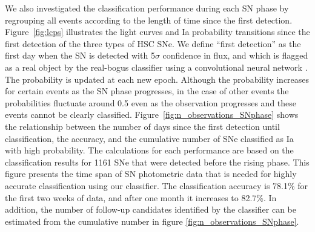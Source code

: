 \documentclass[proof]{pasj01}
\begin{document}
We also investigated the classification performance during each SN phase by regrouping all events according to the length of time since the first detection.
Figure\ \ref{fig:lcps} illustrates the light curves and Ia probability transitions since the first detection of the three types of HSC SNe.
We define ``first detection'' as the first day when the SN is detected with 5$\sigma$ confidence in flux, and which is flagged as a real object by the real-bogus classifier using a convolutional neural network \citep{yasuda19a}.
The probability is updated at each new epoch.
Although the probability increases for certain events as the SN phase progresses, in the case of other events the probabilities fluctuate around 0.5 even as the observation progresses and these events cannot be clearly classified.
Figure\ \ref{fig:n_observations_SNphase} shows the relationship between the number of days since the first detection until classification, the accuracy, and the cumulative number of SNe classified as Ia with high probability.
The calculations for each performance are based on the classification results for 1161 SNe that were detected before the rising phase.
This figure presents the time span of SN photometric data that is needed for highly accurate classification using our classifier.
The classification accuracy is 78.1\% for the first two weeks of data, and after one month it increases to 82.7\%.
In addition, the number of follow-up candidates identified by the classifier can be estimated from the cumulative number in figure \ref{fig:n_observations_SNphase}.
\end{document}
